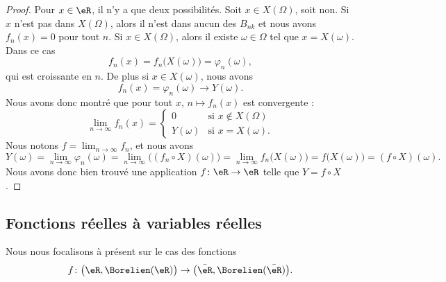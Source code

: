 \begin{proof}
    Pour \( x\in \eR\), il n'y a que deux possibilités. Soit \( x\in X(\Omega)\), soit non. Si \( x\) n'est pas dans \( X(\Omega)\), alors il n'est dans aucun des \( B_{nk}\) et nous avons \( f_n(x)=0\) pour tout \( n\). Si \( x\in X(\Omega)\), alors il existe \( \omega\in \Omega\) tel que \( x=X(\omega)\). Dans ce cas
    \begin{equation}
        f_n(x)=f_n\big( X(\omega) \big)=\varphi_n(\omega),
    \end{equation}
    qui est croissante en \( n\). De plus si \( x\in X(\omega)\), nous avons
    \begin{equation}
        f_n(x)=\varphi_n(\omega)\to Y(\omega).
    \end{equation}
    Nous avons donc montré que pour tout \( x\), \( n\mapsto f_n(x)\) est convergente :
    \begin{equation}
        \lim_{n\to \infty} f_n(x)=\begin{cases}
            0    &   \text{si } x\notin X(\Omega)\\
            Y(\omega)    &    \text{si } x=X(\omega).
        \end{cases}
    \end{equation}
    Nous notons \( f=\lim_{n\to \infty} f_n\), et nous avons
    \begin{equation}
        Y(\omega)=\lim_{n\to \infty} \varphi_n(\omega)=\lim_{n\to \infty} \Big( (f_n\circ X)(\omega) \Big)=\lim_{n\to \infty} f_n\big( X(\omega) \big)=f\big( X(\omega) \big)=(f\circ X)(\omega).
    \end{equation}
    Nous avons donc bien trouvé une application \( f\colon \eR\to \eR\) telle que \( Y=f\circ X\).
\end{proof}

\subsection{Fonctions réelles à variables réelles}

Nous nous focalisons à présent sur le cas des fonctions
\begin{equation}
	f\colon \big( \eR,\Borelien(\eR) \big)\to \big( \bar\eR,\Borelien(\bar \eR) \big).
\end{equation}

